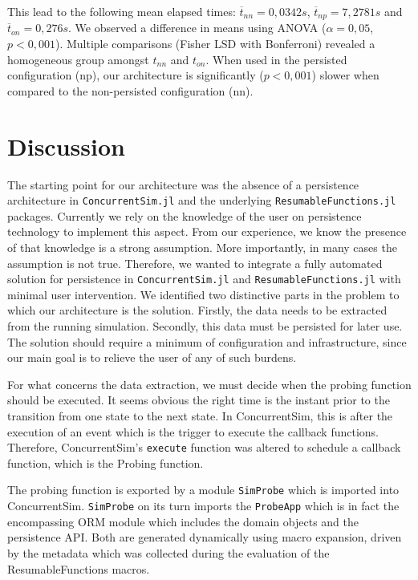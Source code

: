 \documentclass{juliacon}
\begin{document}
This lead to the following mean elapsed times: $\overline{t}_{nn}=0,0342 s$,  $\overline{t}_{np} = 7,2781 s$ and $\overline{t}_{on} = 0,276 s$. We observed a difference in means using ANOVA ($\alpha = 0,05$, $p<0,001 $). Multiple comparisons (Fisher LSD with Bonferroni) revealed a homogeneous group amongst $t_{nn}$ and $t_{on}$. When used in the persisted configuration (np), our architecture is significantly ($p < 0,001$) slower when compared to the non-persisted configuration (nn).


\vskip 6pt

\section{Discussion}

The starting point for our architecture was the absence of a persistence architecture in \texttt{ConcurrentSim.jl} and the underlying \texttt{ResumableFunctions.jl} packages. Currently we rely on the knowledge of the user on persistence technology to implement this aspect. From our experience, we know the presence of that knowledge is a strong assumption. More importantly, in many cases the assumption is not true. Therefore, we wanted to integrate a fully automated solution for persistence in \texttt{ConcurrentSim.jl} and \texttt{ResumableFunctions.jl} with minimal user intervention. We identified two distinctive parts in the problem to which our architecture is the solution. Firstly, the data needs to be extracted from the running simulation. Secondly, this data must be persisted for later use. The solution should require a minimum of configuration and infrastructure, since our main goal is to relieve the user of any of such burdens.\vskip 6pt

For what concerns the data extraction, we must decide when the probing function should be executed. It seems obvious the right time is the instant prior to the transition from one state to the next state. In ConcurrentSim, this is after the execution of an event which is the trigger to execute the callback functions. Therefore, ConcurrentSim's \texttt{execute} function was altered to schedule a callback function, which is the Probing function. \vskip 6pt

The probing function is exported by a module \texttt{SimProbe} which is imported into ConcurrentSim. \texttt{SimProbe} on its turn imports the \texttt{ProbeApp} which is in fact the encompassing ORM module which includes the domain objects and the persistence API. Both are generated dynamically using macro expansion, driven by the metadata which was collected during the evaluation of the ResumableFunctions macros. \vskip 6pt
\end{document}
